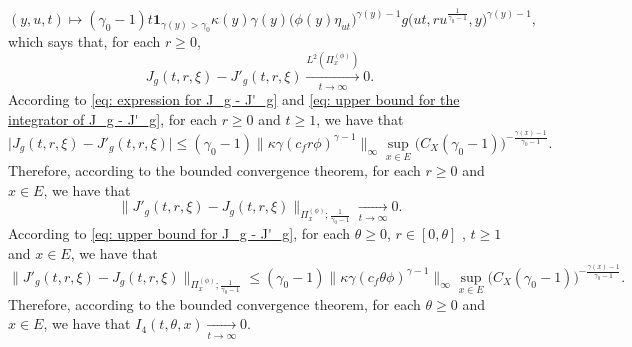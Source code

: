 \documentclass[12pt, a4paper]{amsart}
\theoremstyle{definition}
\numberwithin{equation}{section}
\begin{document}
\[
	(y,u,t)\mapsto (\gamma_0 - 1)t  \mathbf 1_{\gamma(y)> \gamma_0}  \kappa(y)\gamma(y) \big(   \phi(y) \eta_{ut}   \big)^{\gamma(y) - 1} g \big(ut,ru^{\frac{1}{\gamma_0 - 1}},y \big)^{\gamma(y)-1},
\]
	which says that, for each $r\geq 0$,
\[
	J_g(t,r,\xi) - J'_g(t,r,\xi)
\xrightarrow[t\to \infty]{L^2(\Pi_x^{(\phi)})} 0.
\]
	According to \eqref{eq: expression for J_g - J'_g} and \eqref{eq: upper bound for the integrator of J_g - J'_g}, for each $r\geq 0$ and $t\geq 1$, we have that
\[\label{eq: upper bound for J_g - J'_g}
	\big |	J_g(t,r,\xi) - J'_g(t,r,\xi)  \big |
	\leq (\gamma_0 - 1) \big\| \kappa \gamma (c_f r\phi)^{\gamma - 1}\big\|_\infty \sup_{x\in E} \big( C_X(\gamma_0 - 1) \big)^{-\frac{\gamma(x) - 1}{\gamma_0 - 1}}.
\]
	Therefore, according to the bounded convergence theorem, for each $r\geq 0$ and $x\in E$, we have that
\[
		\big\| J'_g(t,r,\xi) - J_g(t,r,\xi)  \big\|_{\Pi_x^{(\phi)};\frac{1}{\gamma_0 - 1}}
		\xrightarrow[t\to \infty]{} 0.
\]
	According to \eqref{eq: upper bound for J_g - J'_g}, for each $\theta \geq 0$, $r\in [0,\theta]$ , $t\geq 1$ and $x\in E$, we have that
\[
	\big\| J'_g(t,r,\xi) - J_g(t,r,\xi)  \big\|_{\Pi_x^{(\phi)};\frac{1}{\gamma_0 - 1}}
	\leq (\gamma_0 - 1) \big\| \kappa \gamma (c_f \theta \phi)^{\gamma - 1}\big\|_\infty \sup_{x\in E} \big( C_X(\gamma_0 - 1) \big)^{-\frac{\gamma(x) - 1}{\gamma_0 - 1}}.
\]
	Therefore, according to the bounded convergence theorem, for each $\theta \geq 0$ and $x\in E$, we have that $I_4(t,\theta, x) \xrightarrow[t\to \infty]{} 0$.
	
\end{document}
